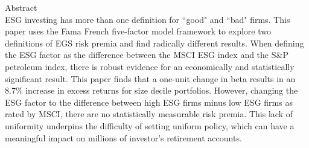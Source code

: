 \pagebreak
\hspace{0pt}
\vfill
\begin{center}
\Huge{Abstract}\\
\normalsize
\vspace{2cm}
ESG investing has more than one definition for  ``good" and ``bad" firms. This paper uses the Fama French five-factor model framework to explore two definitions of EGS risk premia and find radically different results.  When defining the ESG factor as the difference between the MSCI ESG index and the S\&P petroleum index, there is robust evidence for an economically and statistically significant result. This paper finds that a one-unit change in beta results in an 8.7\% increase in excess returns for size decile portfolios. However, changing the ESG factor to the difference between high ESG firms minus low ESG firms as rated by MSCI, there are no statistically measurable risk premia. This lack of uniformity underpins the difficulty of setting uniform policy, which can have a meaningful impact on millions of investor's retirement accounts.  
\end{center}
\vfill
\hspace{0pt}
\pagebreak